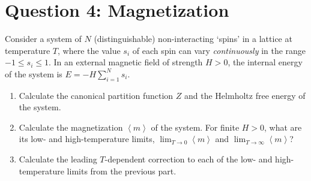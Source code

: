\documentclass[12 pt]{article} %
\newcommand{\vev}[1]{\ensuremath{\left\langle #1 \right\rangle} }
\newcommand{\showmarks}[1]{\rightline{\texttt{[#1 marks]}}} %
\begin{document}
\newpage
\section*{Question 4: Magnetization}
Consider a system of $N$ (distinguishable) non-interacting `spins' in a lattice at temperature $T$, where the value $s_i$ of each spin can vary \emph{continuously} in the range $-1 \leq s_i \leq 1$.
In an external magnetic field of strength $H > 0$, the internal energy of the system is $\displaystyle E = -H \sum_{i = 1}^N s_i$.

\begin{enumerate}[label={(\alph*)}]
  \item Calculate the canonical partition function $Z$ and the Helmholtz free energy of the system.

  \showmarks{4}

  \item Calculate the magnetization $\vev{m}$ of the system.
        For finite $H > 0$, what are its low- and high-temperature limits, $\displaystyle \lim_{T \to 0} \vev{m}$ and $\displaystyle \lim_{T \to \infty} \vev{m}$?

  \showmarks{4}

  \item Calculate the leading $T$-dependent correction to each of the low- and high-temperature limits from the previous part.

  \showmarks{4}
\end{enumerate}



\end{document}
